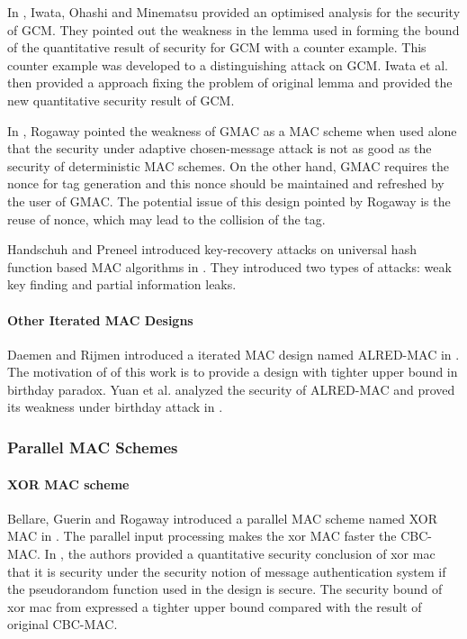 \documentclass{article}
\begin{document}
In \cite{breaking}, Iwata, Ohashi and Minematsu provided an optimised analysis for the security of GCM. They pointed out the weakness in the lemma used in forming the bound of the quantitative result of security for GCM with a counter example. This counter example was developed to a distinguishing attack on GCM. Iwata et al. then provided a approach fixing the problem of original lemma and provided the new quantitative security result of GCM. 

In \cite{Rogaway2011}, Rogaway pointed the weakness of GMAC as a MAC scheme when used alone that the security under adaptive chosen-message attack is not as good as the security of deterministic MAC schemes. On the other hand, GMAC requires the nonce for tag generation and this nonce should be maintained and refreshed by the user of GMAC. The potential issue of this design pointed by Rogaway is the reuse of nonce, which may lead to the collision of the tag. 

Handschuh and Preneel introduced key-recovery attacks on universal hash function based MAC algorithms in \cite{key_recover}. They introduced two types of attacks: weak key finding and partial information leaks.

\paragraph{Other Iterated MAC Designs}
Daemen and Rijmen introduced a iterated MAC design named ALRED-MAC in \cite{alred}. The motivation of of this work is to provide a design with tighter upper bound in birthday paradox. Yuan et al. analyzed the security of ALRED-MAC and proved its weakness under birthday attack in \cite{}. 

\subsubsection{Parallel MAC Schemes}
\paragraph{XOR MAC scheme}
Bellare, Guerin and Rogaway introduced a parallel MAC scheme named XOR MAC in \cite{xor-mac}. 
The parallel input processing makes the xor MAC faster the CBC-MAC. 
In \cite{xor-mac}, the authors provided a quantitative security conclusion of xor mac that it is security under the security notion of message authentication system if the pseudorandom function used in the design is secure. The security bound of xor mac from \cite{xor-mac} expressed a tighter upper bound compared with the result of original CBC-MAC. 
\end{document}
